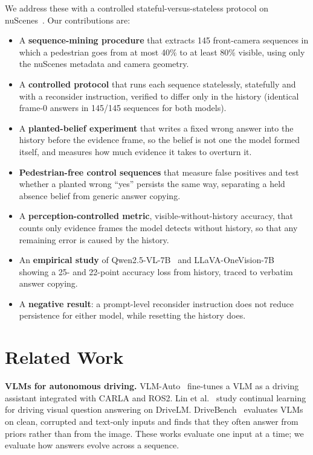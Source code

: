 \documentclass[conference]{IEEEtran}
\begin{document}
We address these with a controlled stateful-versus-stateless protocol on nuScenes~\cite{caesar2020nuscenes}. Our contributions are:
\begin{itemize}
  \item A \textbf{sequence-mining procedure} that extracts 145 front-camera sequences in which a pedestrian goes from at most 40\% to at least 80\% visible, using only the nuScenes metadata and camera geometry.
  \item A \textbf{controlled protocol} that runs each sequence statelessly, statefully and with a reconsider instruction, verified to differ only in the history (identical frame-0 answers in 145/145 sequences for both models).
  \item A \textbf{planted-belief experiment} that writes a fixed wrong answer into the history before the evidence frame, so the belief is not one the model formed itself, and measures how much evidence it takes to overturn it.
  \item \textbf{Pedestrian-free control sequences} that measure false positives and test whether a planted wrong ``yes'' persists the same way, separating a held absence belief from generic answer copying.
  \item A \textbf{perception-controlled metric}, visible-without-history accuracy, that counts only evidence frames the model detects without history, so that any remaining error is caused by the history.
  \item An \textbf{empirical study} of Qwen2.5-VL-7B~\cite{bai2025qwen25vl} and LLaVA-OneVision-7B~\cite{li2024llavaov} showing a 25- and 22-point accuracy loss from history, traced to verbatim answer copying.
  \item A \textbf{negative result}: a prompt-level reconsider instruction does not reduce persistence for either model, while resetting the history does.
\end{itemize}

\section{Related Work}

\textbf{VLMs for autonomous driving.} VLM-Auto~\cite{guo2024vlmauto} fine-tunes a VLM as a driving assistant integrated with CARLA and ROS2. Lin et al.~\cite{lin2025continual} study continual learning for driving visual question answering on DriveLM. DriveBench~\cite{xie2025drivebench} evaluates VLMs on clean, corrupted and text-only inputs and finds that they often answer from priors rather than from the image. These works evaluate one input at a time; we evaluate how answers evolve across a sequence.
\end{document}
